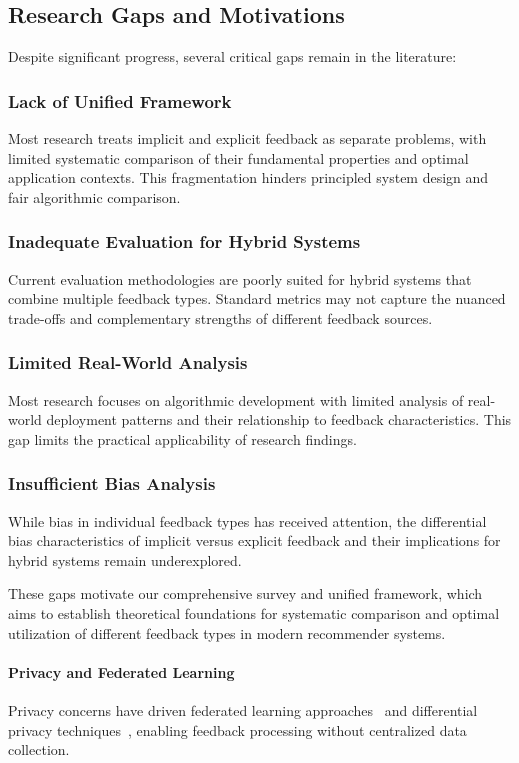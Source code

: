 \subsection{Research Gaps and Motivations}

Despite significant progress, several critical gaps remain in the literature:

\subsubsection{Lack of Unified Framework}
Most research treats implicit and explicit feedback as separate problems, with limited systematic comparison of their fundamental properties and optimal application contexts. This fragmentation hinders principled system design and fair algorithmic comparison.

\subsubsection{Inadequate Evaluation for Hybrid Systems}
Current evaluation methodologies are poorly suited for hybrid systems that combine multiple feedback types. Standard metrics may not capture the nuanced trade-offs and complementary strengths of different feedback sources.

\subsubsection{Limited Real-World Analysis}
Most research focuses on algorithmic development with limited analysis of real-world deployment patterns and their relationship to feedback characteristics. This gap limits the practical applicability of research findings.

\subsubsection{Insufficient Bias Analysis}
While bias in individual feedback types has received attention, the differential bias characteristics of implicit versus explicit feedback and their implications for hybrid systems remain underexplored.

These gaps motivate our comprehensive survey and unified framework, which aims to establish theoretical foundations for systematic comparison and optimal utilization of different feedback types in modern recommender systems.

\paragraph{Privacy and Federated Learning}
Privacy concerns have driven federated learning approaches~\cite{chai2020secure} and differential privacy techniques~\cite{jia2021privacy}, enabling feedback processing without centralized data collection.

